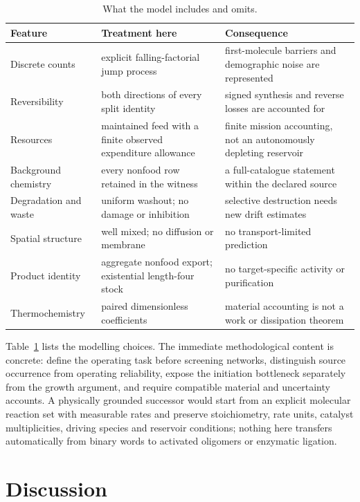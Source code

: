 \documentclass[11pt,letterpaper]{article}
\theoremstyle{plain}
\theoremstyle{definition}
\theoremstyle{remark}
\numberwithin{equation}{section}
\begin{document}
\begin{table}[t]
\centering\small
\begin{tabular}{@{}p{.2\linewidth}p{.38\linewidth}p{.36\linewidth}@{}}
\toprule
Feature & Treatment here & Consequence\\
\midrule
Discrete counts & explicit falling-factorial jump process & first-molecule barriers and demographic noise are represented\\
Reversibility & both directions of every split identity & signed synthesis and reverse losses are accounted for\\
Resources & maintained feed with a finite observed expenditure allowance & finite mission accounting, not an autonomously depleting reservoir\\
Background chemistry & every nonfood row retained in the witness & a full-catalogue statement within the declared source\\
Degradation and waste & uniform washout; no damage or inhibition & selective destruction needs new drift estimates\\
Spatial structure & well mixed; no diffusion or membrane & no transport-limited prediction\\
Product identity & aggregate nonfood export; existential length-four stock & no target-specific activity or purification\\
Thermochemistry & paired dimensionless coefficients & material accounting is not a work or dissipation theorem\\
\bottomrule
\end{tabular}
\caption{What the model includes and omits.}
\label{tab:scope}
\end{table}

Table~\ref{tab:scope} lists the modelling choices. The immediate methodological content is concrete: define the operating task before screening networks, distinguish source occurrence from operating reliability, expose the initiation bottleneck separately from the growth argument, and require compatible material and uncertainty accounts. A physically grounded successor would start from an explicit molecular reaction set with measurable rates and preserve stoichiometry, rate units, catalyst multiplicities, driving species and reservoir conditions; nothing here transfers automatically from binary words to activated oligomers or enzymatic ligation.

\section{Discussion}\label{sec:discussion}
\end{document}
